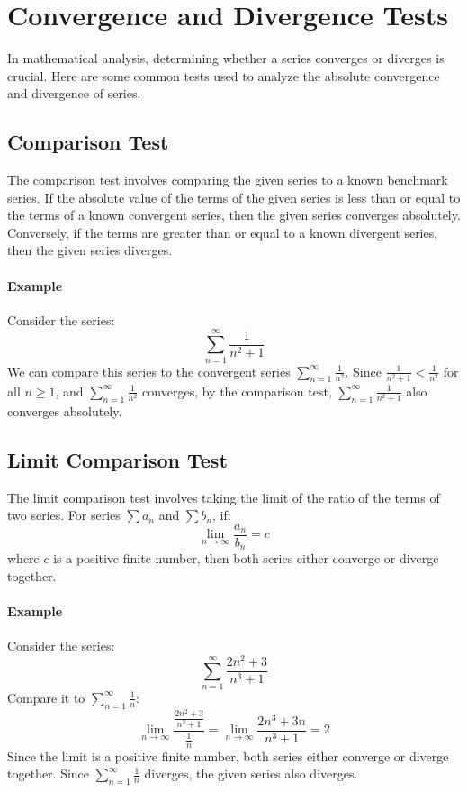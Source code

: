 \documentclass{article}
\begin{document}
\section*{Convergence and Divergence Tests}

In mathematical analysis, determining whether a series converges or diverges is crucial. Here are some common tests used to analyze the absolute convergence and divergence of series.

\subsection*{Comparison Test}
The comparison test involves comparing the given series to a known benchmark series. If the absolute value of the terms of the given series is less than or equal to the terms of a known convergent series, then the given series converges absolutely. Conversely, if the terms are greater than or equal to a known divergent series, then the given series diverges.

\paragraph{Example}
Consider the series:
\[
\sum_{n=1}^\infty \frac{1}{n^2 + 1}
\]
We can compare this series to the convergent series \(\sum_{n=1}^\infty \frac{1}{n^2}\). Since \(\frac{1}{n^2 + 1} < \frac{1}{n^2}\) for all \(n \geq 1\), and \(\sum_{n=1}^\infty \frac{1}{n^2}\) converges, by the comparison test, \(\sum_{n=1}^\infty \frac{1}{n^2 + 1}\) also converges absolutely.

\subsection*{Limit Comparison Test}
The limit comparison test involves taking the limit of the ratio of the terms of two series. For series \(\sum a_n\) and \(\sum b_n\), if:
\[
\lim_{n \to \infty} \frac{a_n}{b_n} = c
\]
where \(c\) is a positive finite number, then both series either converge or diverge together.

\paragraph{Example}
Consider the series:
\[
\sum_{n=1}^\infty \frac{2n^2 + 3}{n^3 + 1}
\]
Compare it to \(\sum_{n=1}^\infty \frac{1}{n}\):
\[
\lim_{n \to \infty} \frac{\frac{2n^2 + 3}{n^3 + 1}}{\frac{1}{n}} = \lim_{n \to \infty} \frac{2n^3 + 3n}{n^3 + 1} = 2
\]
Since the limit is a positive finite number, both series either converge or diverge together. Since \(\sum_{n=1}^\infty \frac{1}{n}\) diverges, the given series also diverges.
\end{document}
